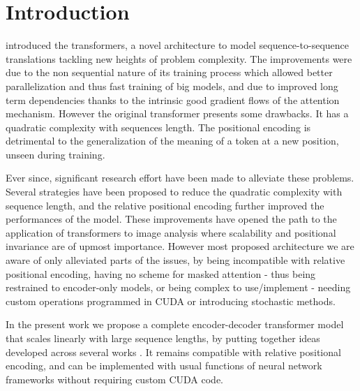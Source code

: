 \section{\label{sec:introduction}Introduction}

\citet{vaswani2017attention} introduced the transformers, a novel architecture to model sequence-to-sequence translations tackling new heights of problem complexity. The improvements were due to the non sequential nature of its training process which allowed better parallelization and thus fast training of big models, and due to improved long term dependencies thanks to the intrinsic good gradient flows of the attention mechanism. However the original transformer presents some drawbacks. It has a quadratic complexity with sequences length. The positional encoding is detrimental to the generalization of the meaning of a token at a new position, unseen during training.

Ever since, significant research effort have been made to alleviate these problems. Several strategies have been proposed to reduce the quadratic complexity with sequence length, and the relative positional encoding further improved the performances of the model. These improvements have opened the path to the application of transformers to image analysis where scalability and positional invariance are of upmost importance. However most proposed architecture we are aware of only alleviated parts of the issues, by being incompatible with relative positional encoding, having no scheme for masked attention - thus being restrained to encoder-only models, or being complex to use/implement - needing custom operations programmed in CUDA or introducing stochastic methods.

In the present work we propose a complete encoder-decoder transformer model that scales linearly with large sequence lengths, by putting together ideas developed across several works \cite{vaswani2017attention,shen2020efficient,katharopoulos2020transformers,choromanski2021rethinking,shaw2018selfattention,horn2021translational}. It remains compatible with relative positional encoding, and can be implemented with usual functions of neural network frameworks without requiring custom CUDA code.

\endinput
